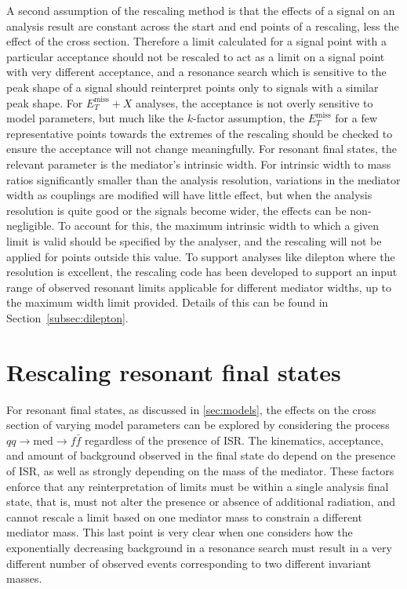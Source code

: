 \documentclass[a4paper, 11pt]{article}
\newcommand{\MET}{\ensuremath{E_T^\mathrm{miss}}\xspace}
\newcommand{\metplusx}{\ensuremath{\MET+X}\xspace}
\begin{document}
A second assumption of the rescaling method is that the effects of a signal on an analysis result are constant across the start and end points of a rescaling, less the effect of the cross section. Therefore a limit calculated for a signal point with a particular acceptance should not be rescaled to act as a limit on a signal point with very different acceptance, and a resonance search which is sensitive to the peak shape of a signal should reinterpret points only to signals with a similar peak shape. For \metplusx analyses, the acceptance is not overly sensitive to model parameters, but much like the $k$-factor assumption, the \MET for a few representative points towards the extremes of the rescaling should be checked to ensure the acceptance will not change meaningfully. For resonant final states, the relevant parameter is the mediator's intrinsic width. For intrinsic width to mass ratios significantly smaller than the analysis resolution, variations in the mediator width as couplings are modified will have little effect, but when the analysis resolution is quite good or the signals become wider, the effects can be non-negligible. To account for this, the maximum intrinsic width to which a given limit is valid should be specified by the analyser, and the rescaling will not be applied for points outside this value. To support analyses like dilepton where the resolution is excellent, the rescaling code has been developed to support an input range of observed resonant limits applicable for different mediator widths, up to the maximum width limit provided. Details of this can be found in Section~\ref{subsec:dilepton}.

\section{Rescaling resonant final states}
\label{sec:resonant}

For resonant final states, as discussed in \ref{sec:models}, the effects on the cross section of varying model parameters can be explored by considering the process $qq\rightarrow \text{med} \rightarrow f \bar{f}$ regardless of the presence of ISR. The kinematics, acceptance, and amount of background observed in the final state do depend on the presence of ISR, as well as strongly depending on the mass of the mediator. These factors enforce that any reinterpretation of limits must be within a single analysis final state, that is, must not alter the presence or absence of additional radiation, and cannot rescale a limit based on one mediator mass to constrain a different mediator mass. This last point is very clear when one considers how the exponentially decreasing background in a resonance search must result in a very different number of observed events corresponding to two different invariant masses. 
\end{document}
